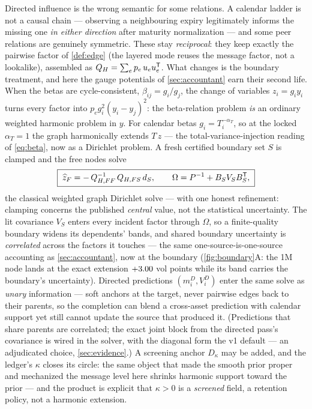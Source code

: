 \documentclass[11pt]{article}
\newcommand{\QH}{Q_{H}}
\begin{document}
Directed influence is the wrong semantic for some relations.  A calendar
ladder is not a causal chain --- observing a neighbouring expiry
legitimately informs the missing one \emph{in either direction} after
maturity normalization --- and some peer relations are genuinely
symmetric.  These stay \emph{reciprocal}: they keep exactly the pairwise
factor of \cref{def:edge} (the layered mode reuses the message factor,
not a lookalike), assembled as $\QH=\sum_e p_e\,u_eu_e\T$.  What changes
is the boundary treatment, and here the gauge potentials of
\cref{sec:accountant} earn their second life.  When the betas are
cycle-consistent, $\beta_{ij}=g_i/g_j$, the change of variables
$z_i=g_iy_i$ turns every factor into $p_e g_i^2(y_i-y_j)^2$: the
beta-relation problem \emph{is} an ordinary weighted harmonic problem in
$y$.  For calendar betas $g_i=T_i^{-\alpha_T}$, so at the locked
$\alpha_T=1$ the graph harmonically extends $T\,z$ --- the
total-variance-injection reading of \eqref{eq:beta}, now as a Dirichlet
problem.  A fresh certified boundary set $S$ is clamped and the free
nodes solve
\begin{equation}
\boxed{\;
\widehat z_F=-\,Q_{H,FF}^{-1}\,Q_{H,FS}\,d_S,
\qquad
\Omega=P^{-1}+B_S V_S B_S^{\mathsf{T}},
\;}
\label{eq:dirichlet}
\end{equation}
the classical weighted graph Dirichlet solve --- with one honest
refinement: clamping concerns the published \emph{central} value, not the
statistical uncertainty.  The lit covariance $V_S$ enters every incident
factor through $\Omega$, so a finite-quality boundary widens its
dependents' bands, and shared boundary uncertainty is \emph{correlated}
across the factors it touches --- the same one-source-is-one-source
accounting as \cref{sec:accountant}, now at the boundary
(\cref{fig:boundary}A: the 1M node lands at the exact extension
$+3.00$ vol points while its band carries the boundary's
uncertainty).  Directed predictions $(m^D_i,V^D_i)$ enter the same solve
as \emph{unary} information --- soft anchors at the target, never
pairwise edges back to their parents, so the completion can blend a
cross-asset prediction with calendar support yet still cannot update the
source that produced it.  (Predictions that share parents are correlated;
the exact joint block from the directed pass's covariance is wired in the
solver, with the diagonal form the v1 default --- an adjudicated choice,
\cref{sec:evidence}.)  A screening anchor $D_\kappa$ may be added, and
the ledger's $\kappa$ closes its circle: the same object that made the
smooth prior proper and mechanized the message level here shrinks
harmonic support toward the prior --- and the product is explicit that
$\kappa>0$ is a \emph{screened} field, a retention policy, not a harmonic
extension.
\end{document}
